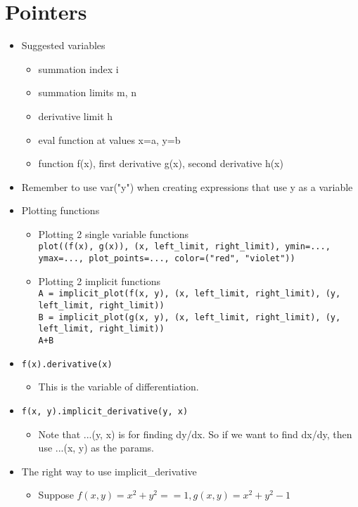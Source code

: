 \documentclass{article}
\newcommand{\code}{\texttt}
\begin{document}
\section*{Pointers}
\begin{itemize}
	\item Suggested variables
	\begin{itemize}
		\item summation index i
		\item summation limits m, n
		\item derivative limit h
		\item eval function at values x=a, y=b
		\item function f(x), first derivative g(x), second derivative h(x)
	\end{itemize}
	\item Remember to use var("y") when creating expressions that use y as a variable
	\item Plotting functions
	\begin{itemize}
		\item Plotting 2 single variable functions\\
		\code{plot((f(x), g(x)), (x, left\_limit, right\_limit), ymin=..., ymax=..., plot\_points=..., color=("red", "violet"))}
		\item Plotting 2 implicit functions\\
		\code{A = implicit\_plot(f(x, y), (x, left\_limit, right\_limit), (y, left\_limit, right\_limit))}\\
		\code{B = implicit\_plot(g(x, y), (x, left\_limit, right\_limit), (y, left\_limit, right\_limit))}\\
		\code{A+B}
	\end{itemize}
	\item \code{f(x).derivative(x)}
	\begin{itemize}
		\item This is the variable of differentiation.
	\end{itemize}
	\item \code{f(x, y).implicit\_derivative(y, x)}
	\begin{itemize}
		\item Note that ...(y, x) is for finding dy/dx. So if we want to find dx/dy, then use ...(x, y) as the params.
	\end{itemize}
	\item The right way to use implicit\_derivative
	\begin{itemize}
		\item Suppose $f(x, y) = x^2 + y^2 == 1, g(x, y) = x^2 + y^2 - 1$

\end{itemize}
\end{itemize}
\end{document}
